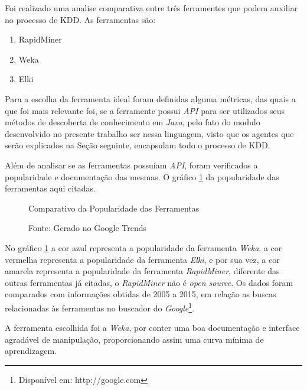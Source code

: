 Foi realizado uma analise comparativa entre três ferramentes que podem auxiliar no processo de KDD. As ferramentas são:
\begin{enumerate}
\item RapidMiner
\item Weka
\item Elki
\end{enumerate}

Para a escolha da ferramenta ideal foram definidas alguma métricas, das quais a que foi mais relevante foi, se a ferramente possui \textit{API} para ser utilizados seus métodos de descoberta de conhecimento em \textit{Java}, pelo fato do modulo desenvolvido no presente trabalho ser nessa linguagem, visto que os agentes que serão explicados na Seção seguinte, encapsulam todo o processo de KDD.

Além de analisar se as ferramentas possuíam \textit{API}, foram verificados a popularidade e documentação das mesmas. O gráfico \ref{fig:comparativoferramentas} da popularidade das ferramentas aqui citadas.

\begin{figure}[!ht]
\caption{Comparativo da Popularidade das Ferramentas}
\centering
{}
\caption*{Fonte: Gerado no Google Trends}
\label{fig:comparativoferramentas}
\end{figure}

No gráfico \ref{fig:comparativoferramentas} a cor azul representa a popularidade da ferramenta \textit{Weka}, a cor vermelha representa a popularidade da ferramenta \textit{Elki}, e por sua vez, a cor amarela representa a popularidade da ferramenta \textit{RapidMiner}, diferente das outras ferramentas já citadas, o \textit{RapidMiner} não é \textit{open source}. Os dados foram comparados com informações obtidas de 2005 a 2015, em relação as buscas relacionadas às ferramentas no buscador do \textit{Google}\footnote{Disponível em: http://google.com}.

A ferramenta escolhida foi a \textit{Weka}, por conter uma boa documentação e interface agradável de manipulação, proporcionando assim uma curva mínima de aprendizagem.


